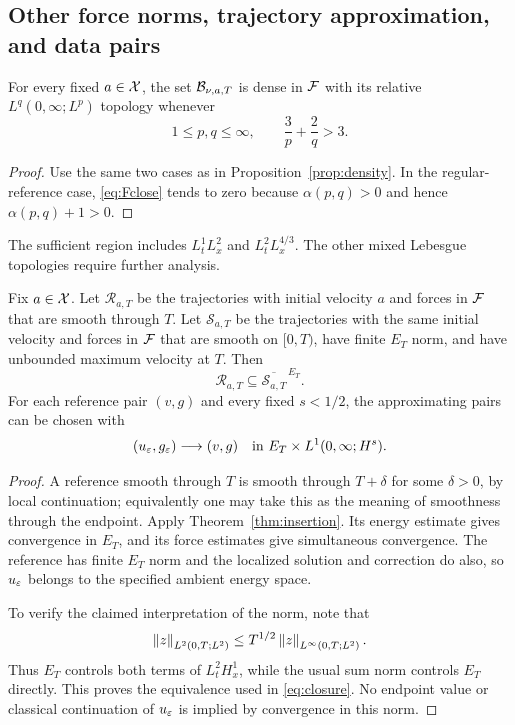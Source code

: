 \subsection{Other force norms, trajectory approximation, and data pairs}
\begin{corollary}\label{cor:mixed}
For every fixed $a\in\mathcal X$, the set $\mathcal B_{\nu,a,T}$ is dense in $\mathcal F$ with its relative $L^q(0,\infty;L^p)$ topology whenever
\begin{equation}\label{eq:mixedregion}
 1\le p,q\le\infty,\qquad \frac3p+\frac2q>3.
\end{equation}
\end{corollary}
\begin{proof}
Use the same two cases as in Proposition~\ref{prop:density}. In the regular-reference case, \eqref{eq:Fclose} tends to zero because
$\alpha(p,q)>0$ and hence $\alpha(p,q)+1>0$.
\end{proof}
The sufficient region includes $L^1_tL^2_x$ and $L^2_tL^{4/3}_x$. The other mixed Lebesgue topologies require further analysis.

\begin{corollary}\label{cor:closure}
Fix $a\in\mathcal X$. Let $\mathcal R_{a,T}$ be the trajectories with initial velocity $a$ and forces in $\mathcal F$ that are smooth through $T$.
Let $\mathcal S_{a,T}$ be the trajectories with the same initial velocity and forces in $\mathcal F$ that are smooth on $[0,T)$, have finite $E_T$ norm, and have unbounded maximum velocity at $T$. Then
\begin{equation}\label{eq:closure}
 \mathcal R_{a,T}\subseteq\overline{\mathcal S_{a,T}}^{\,E_T}.
\end{equation}
For each reference pair $(v,g)$ and every fixed $s<1/2$, the approximating pairs can be chosen with
\[
 (u_\varepsilon,g_\varepsilon)\longrightarrow(v,g)
 \quad\hbox{in }E_T\times L^1(0,\infty;H^s).
\]
\end{corollary}
\begin{proof}
A reference smooth through $T$ is smooth through $T+\delta$ for some
$\delta>0$, by local continuation; equivalently one may take this as the meaning of smoothness through the endpoint. Apply Theorem~\ref{thm:insertion}. Its energy estimate gives convergence in $E_T$, and its force estimates give simultaneous convergence. The reference has finite $E_T$ norm and the localized solution and correction do also, so $u_\varepsilon$ belongs to the specified ambient energy space.

To verify the claimed interpretation of the norm, note that
\[
 \left\lVert z\right\rVert_{L^2(0,T;L^2)}
 \le T^{1/2}\left\lVert z\right\rVert_{L^\infty(0,T;L^2)}.
\]
Thus $E_T$ controls both terms of $L^2_tH^1_x$, while the usual sum norm controls $E_T$ directly. This proves the equivalence used in \eqref{eq:closure}. No endpoint value or classical continuation of $u_\varepsilon$ is implied by convergence in this norm.
\end{proof}

